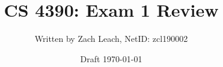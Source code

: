 

\title{\Huge CS 4390: Exam 1 Review}
\author{\Large Written by Zach Leach, NetID: zcl190002}
\date{\Large Draft \today \\[36pt]}


\maketitle


